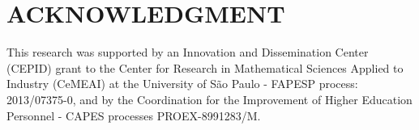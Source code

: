 \documentclass[letterpaper, 10 pt, conference]{ieeeconf}  %
\begin{document}

\section*{ACKNOWLEDGMENT} This research was supported by an Innovation and Dissemination Center (CEPID) grant to the Center for Research in Mathematical Sciences Applied to Industry (CeMEAI) at the University of São Paulo - FAPESP process: 2013/07375-0, and by the Coordination for the Improvement of Higher E\-du\-cation Personnel - CAPES processes PROEX-8991283/M.




\end{document}
